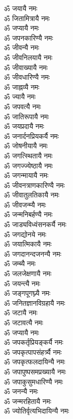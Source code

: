 \begin{flushleft}
\begin{multicols}{2}
ॐ जयायै नमः\\
ॐ जितामित्रायै नमः\\
ॐ जप्यायै नमः\\
ॐ जपनकारिण्यै नमः\\
ॐ जीवन्यै नमः\\
ॐ जीवनिलयायै नमः\hfill{}\\
ॐ जीवाख्यायै नमः\\
ॐ जीवधारिण्यै नमः\\
ॐ जाह्नव्यै नमः\\
ॐ ज्यायै नमः\\
ॐ जपवत्यै नमः\\
ॐ जातिरूपायै नमः\\
ॐ जयप्रदायै नमः\\
ॐ जनार्दनप्रियकर्यै नमः\\
ॐ जोषनीयायै नमः\\
ॐ जगत्स्थितायै नमः\hfill{}\\
ॐ जगज्ज्येष्ठायै नमः\\
ॐ जगन्मायायै नमः\\
ॐ जीवनत्राणकारिण्यै नमः\\
ॐ जीवातुलतिकायै नमः\\
ॐ जीवजन्म्यै नमः\\
ॐ जन्मनिबर्हण्यै नमः\\
ॐ जाड्यविध्वंसनकर्यै नमः\\
ॐ जगद्योनये नमः\\
ॐ जयात्मिकायै नमः\\
ॐ जगदानन्दजनन्यै नमः\hfill{}\\
ॐ जम्ब्यै नमः\\
ॐ जलजेक्षणायै नमः\\
ॐ जयन्त्यै नमः\\
ॐ जङ्गपूगघ्न्यै नमः\\
ॐ जनितज्ञानविग्रहायै नमः\\
ॐ जटायै नमः\\
ॐ जटावत्यै नमः\\
ॐ जप्यायै नमः\\
ॐ जपकर्तृप्रियङ्कर्यै नमः\\
ॐ जपकृत्पापसंहर्त्र्यै नमः\hfill{}\\
ॐ जपकृत्फलदायिन्यै नमः\\
ॐ जपापुष्पसमप्रख्यायै नमः\\
ॐ जपाकुसुमधारिण्यै नमः\\
ॐ जनन्यै नमः\\
ॐ जन्मरहितायै नमः\\
ॐ ज्योतिर्वृत्यभिदायिन्यै नमः\\

\end{multicols}
\end{flushleft}
